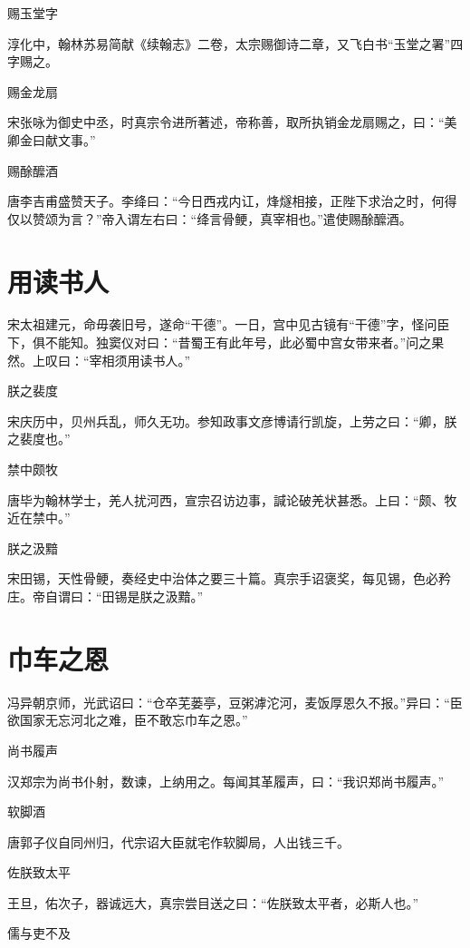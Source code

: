 \documentclass[a4paper,12pt,UTF8,twoside]{ctexbook}
\begin{document}
    赐玉堂字
    
    淳化中，翰林苏易简献《续翰志》二卷，太宗赐御诗二章，又飞白书“玉堂之署”四字赐之。
    
    赐金龙扇
    
    宋张咏为御史中丞，时真宗令进所著述，帝称善，取所执销金龙扇赐之，曰：“美卿金曰献文事。”
    
    赐酴醿酒
    
    唐李吉甫盛赞天子。李绛曰：“今日西戎内讧，烽燧相接，正陛下求治之时，何得仅以赞颂为言？”帝入谓左右曰：“绛言骨鲠，真宰相也。”遣使赐酴醿酒。
    
    \section{用读书人}
    
    宋太祖建元，命毋袭旧号，遂命“干德”。一日，宫中见古镜有“干德”字，怪问臣下，俱不能知。独窦仪对曰：“昔蜀王有此年号，此必蜀中宫女带来者。”问之果然。上叹曰：“宰相须用读书人。”
    
    朕之裴度
    
    宋庆历中，贝州兵乱，师久无功。参知政事文彦博请行凯旋，上劳之曰：“卿，朕之裴度也。”
    
    禁中颇牧
    
    唐毕为翰林学士，羌人扰河西，宣宗召访边事，諴论破羌状甚悉。上曰：“颇、牧近在禁中。”
    
    朕之汲黯
    
    宋田锡，天性骨鲠，奏经史中治体之要三十篇。真宗手诏褒奖，每见锡，色必矜庄。帝自谓曰：“田锡是朕之汲黯。”
    
    \section{巾车之恩}
    
    冯异朝京师，光武诏曰：“仓卒芜蒌亭，豆粥滹沱河，麦饭厚恩久不报。”异曰：“臣欲国家无忘河北之难，臣不敢忘巾车之恩。”
    
    尚书履声
    
    汉郑宗为尚书仆射，数谏，上纳用之。每闻其革履声，曰：“我识郑尚书履声。”
    
    软脚酒
    
    唐郭子仪自同州归，代宗诏大臣就宅作软脚局，人出钱三千。
    
    佐朕致太平
    
    王旦，佑次子，器诚远大，真宗尝目送之曰：“佐朕致太平者，必斯人也。”
    
    儒与吏不及
    
\end{document}
